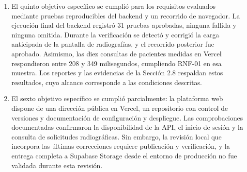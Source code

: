 \begin{enumerate}
    \item El quinto objetivo específico se cumplió para los requisitos
    evaluados mediante pruebas reproducibles del backend y un recorrido
    de navegador. La ejecución final del backend registró 31 pruebas
    aprobadas, ninguna fallida y ninguna omitida. Durante la verificación
    se detectó y corrigió la carga anticipada de la pantalla de
    radiografías, y el recorrido posterior fue aprobado. Asimismo,
    las diez consultas de pacientes medidas en Vercel respondieron
    entre 208 y 349 milisegundos, cumpliendo RNF-01 en esa muestra.
    Los reportes y las evidencias de la Sección 2.8 respaldan estos
    resultados, cuyo alcance corresponde a las condiciones descritas.

    \item El sexto objetivo específico se cumplió parcialmente:
    la plataforma web dispone de una dirección pública en Vercel,
    un repositorio con control de versiones y documentación de
    configuración y despliegue. Las comprobaciones documentadas
    confirmaron la disponibilidad de la API, el inicio de sesión
    y la consulta de solicitudes radiográficas. Sin embargo,
    la revisión local que incorpora las últimas correcciones
    requiere publicación y verificación, y la entrega completa
    a Supabase Storage desde el entorno de producción no fue
    validada durante esta revisión.
\end{enumerate}
